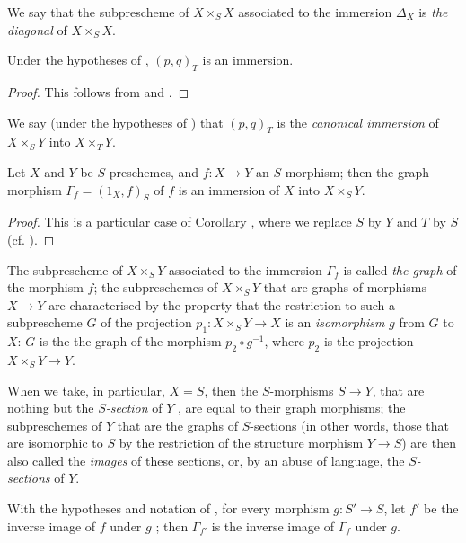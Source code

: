 We say that the subprescheme of $X\times_S X$ associated to the immersion $\Delta_X$  is \emph{the diagonal} of $X\times_S X$.

\begin{cor}[5.3.10]
\label{1.5.3.10}
Under the hypotheses of , $(p,q)_T$ is an immersion.
\end{cor}

\begin{proof}
\label{proof-1.5.3.10}
This follows from  and .
\end{proof}

We say (under the hypotheses of ) that $(p,q)_T$ is the \emph{canonical immersion} of $X\times_S Y$ into $X\times_T Y$.

\begin{cor}[5.3.11]
\label{1.5.3.11}
Let $X$ and $Y$ be $S$-preschemes, and $f:X\to Y$ an $S$-morphism;
then the graph morphism $\Gamma_f=(1_X,f)_S$ of $f$  is an immersion of $X$ into $X\times_S Y$.
\end{cor}

\begin{proof}
\label{proof-1.5.3.11}
This is a particular case of Corollary , where we replace $S$ by $Y$ and $T$ by $S$ (cf. ).
\end{proof}

The subprescheme of $X\times_S Y$ associated to the immersion $\Gamma_f$  is called \emph{the graph} of the morphism $f$;
the subpreschemes of $X\times_S Y$ that are graphs of morphisms $X\to Y$ are characterised by the property that the restriction to such a subprescheme $G$ of the projection $p_1:X\times_S Y\to X$ is an \emph{isomorphism} $g$ from $G$ to $X$:
$G$ is the the graph of the morphism $p_2\circ g^{-1}$, where $p_2$ is the projection $X\times_S Y\to Y$.

When we take, in particular, $X=S$, then the $S$-morphisms $S\to Y$, that are nothing but the \emph{$S$-section} of $Y$ , are equal to their graph morphisms;
the subpreschemes of $Y$ that are the graphs of $S$-sections (in other words, those that are isomorphic to $S$ by the restriction of the structure morphism $Y\to S$) are then also called the \emph{images} of these sections, or, by an abuse of language, the \emph{$S$-sections} of $Y$.

\begin{cor}[5.3.12]
\label{1.5.3.12}
With the hypotheses and notation of , for every morphism $g:S'\to S$, let $f'$ be the inverse image of $f$ under $g$ ;
then $\Gamma_{f'}$ is the inverse image of $\Gamma_f$ under $g$.
\end{cor}

